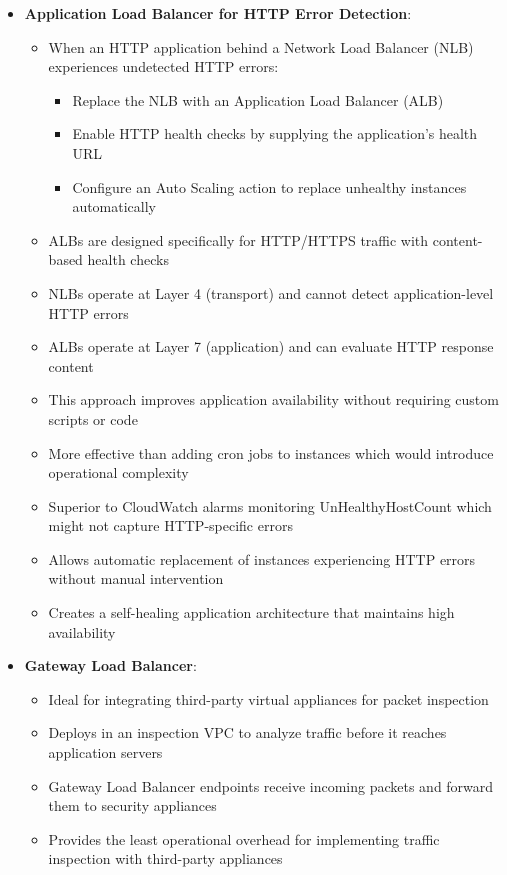\documentclass[11pt,a4paper]{report}
\begin{document}
\begin{itemize}
\begin{itemize}
\end{itemize}
  \item \textbf{Application Load Balancer for HTTP Error Detection}:
\begin{itemize}
  \item When an HTTP application behind a Network Load Balancer (NLB) experiences undetected HTTP errors:
\begin{itemize}
  \item Replace the NLB with an Application Load Balancer (ALB)
  \item Enable HTTP health checks by supplying the application's health URL
  \item Configure an Auto Scaling action to replace unhealthy instances automatically
\end{itemize}
  \item ALBs are designed specifically for HTTP/HTTPS traffic with content-based health checks
  \item NLBs operate at Layer 4 (transport) and cannot detect application-level HTTP errors
  \item ALBs operate at Layer 7 (application) and can evaluate HTTP response content
  \item This approach improves application availability without requiring custom scripts or code
  \item More effective than adding cron jobs to instances which would introduce operational complexity
  \item Superior to CloudWatch alarms monitoring UnHealthyHostCount which might not capture HTTP-specific errors
  \item Allows automatic replacement of instances experiencing HTTP errors without manual intervention
  \item Creates a self-healing application architecture that maintains high availability
\end{itemize}
  \item \textbf{Gateway Load Balancer}:
\begin{itemize}
  \item Ideal for integrating third-party virtual appliances for packet inspection
  \item Deploys in an inspection VPC to analyze traffic before it reaches application servers
  \item Gateway Load Balancer endpoints receive incoming packets and forward them to security appliances
  \item Provides the least operational overhead for implementing traffic inspection with third-party appliances

\end{itemize}
\end{itemize}
\end{document}
